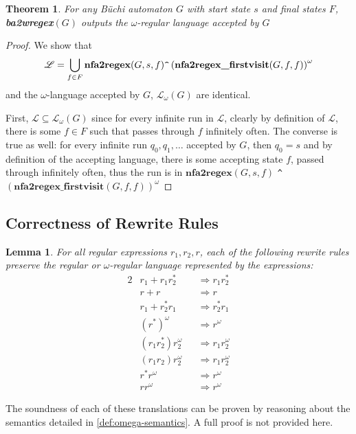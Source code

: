 \documentclass[conference]{IEEEtran}
\newtheorem{theorem}{Theorem}[section]
\newtheorem{lemma}{Lemma}[section]
\theoremstyle{definition}
\theoremstyle{remark}
\newcommand{\Buchi}{B\"{u}chi }
\renewcommand{\L}{\mathscr{L}}
\begin{document}
\begin{theorem}
    For any \Buchi automaton $G$ with start state $s$ and final states $F$, \textbf{ba2wregex}$(G)$ outputs the $\omega$-regular language accepted by $G$
\end{theorem}
\begin{proof}
    We show that
    \[
        \L = \bigcup_{f\in F} \textbf{nfa2regex}(G, s, f) \verb|^| \left(\textbf{nfa2regex\_firstvisit}(G, f, f)\right)^\omega
    \]
    and the $\omega$-language accepted by $G$, $\L_\omega(G)$ are identical.

    First, $\L\subseteq \L_\omega(G)$ since for every infinite run in $\L$, clearly by definition of $\L$, there is some $f\in F$ such that passes through $f$ infinitely often. The converse is true as well: for every infinite run $q_0, q_1, \dots$ accepted by $G$, then $q_0 = s$ and by definition of the accepting language, there is some accepting state $f$, passed through infinitely often, thus the run is in $\textbf{nfa2regex}(G, s, f)$ \verb|^| $\left(\textbf{nfa2regex\_firstvisit}(G, f, f)\right)^\omega$
\end{proof}
\subsection{Correctness of Rewrite Rules}
\begin{lemma}
    For all regular expressions $r_1, r_2, r$, each of the following rewrite rules preserve the regular or $\omega$-regular language represented by the expressions:
    \begin{alignat}{2}
        & r_1 + r_1r_2^* && \Longrightarrow r_1r_2^* \\
        & r + r && \Longrightarrow r \\
        & r_1 + r_2^*r_1 && \Longrightarrow r_2^*r_1 \\
        & (r^*)^{\omega} && \Longrightarrow r^{\omega} \\
        & (r_1r_2^*)r_2^{\omega} && \Longrightarrow r_1r_2^{\omega} \\
        & (r_1r_2)r_2^{\omega} && \Longrightarrow r_1r_2^{\omega} \\
        & r^*r^{\omega} && \Longrightarrow r^{\omega} \\
        & rr^{\omega} && \Longrightarrow r^{\omega}
    \end{alignat}
\end{lemma}

The soundness of each of these translations can be proven by reasoning about the  semantics detailed in \cref{def:omega-semantics}. A full proof is not provided here.
\end{document}
